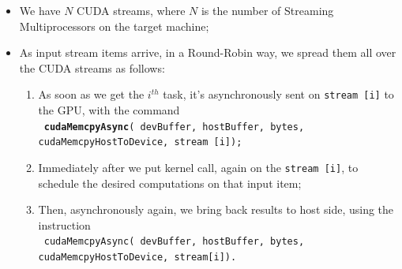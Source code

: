 		
	\begin{itemize}
		\item We have \(N\) CUDA streams, where \(N\) is the number of Streaming Multiprocessors on the target machine;
		\item As input stream items arrive, in a Round-Robin way, we spread them all over the CUDA streams as follows:
		\begin{enumerate}
			\item As soon as we get the \(i^{th}\) task, it's asynchronously sent on \texttt{stream [i]} to the GPU, with the command \\ 
			\texttt{ \textbf{cudaMemcpyAsync}( devBuffer, hostBuffer, bytes, cudaMemcpyHostToDevice, \tab \tab \tab \tab stream [i]);}
			
			\item Immediately after we put kernel call, again on the \texttt{stream [i]}, to schedule the desired computations on that input item;
			
			\item Then, asynchronously again, we bring back results to host side, using the instruction \\
			\texttt{ cudaMemcpyAsync( devBuffer, hostBuffer, bytes, cudaMemcpyHostToDevice, \tab \tab \tab \tab stream[i]).}
			
		\end{enumerate}
	\end{itemize}

